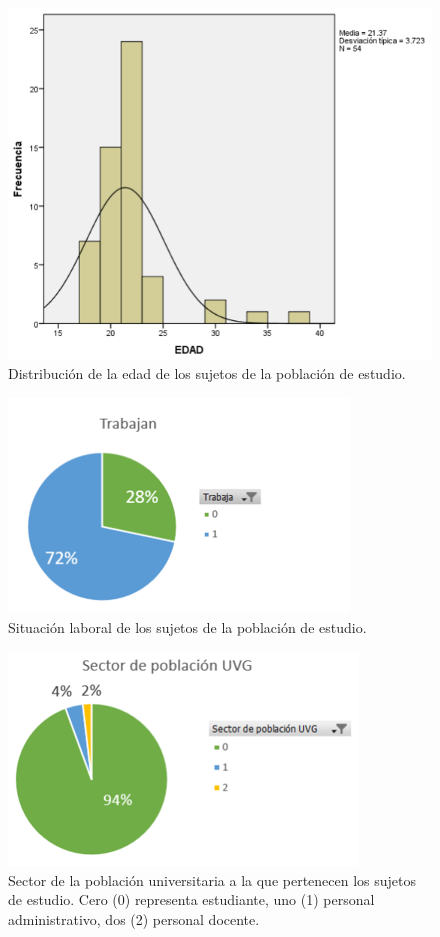 \begin{figure}
    \centering
    \includegraphics[scale=0.85]{figuras/Imagen14.png}
    \caption{Distribución de la edad de los sujetos de la población de estudio.}
    \label{fig:my_label}
\end{figure}
\begin{figure}
    \centering
    \includegraphics[scale=1]{figuras/Imagen15.png}
    \caption{Situación laboral de los sujetos de la población de estudio.}
    \label{fig:my_label}
\end{figure}
\begin{figure}
    \centering
    \includegraphics[scale=1]{figuras/Imagen16.png}
    \caption{Sector de la población universitaria a la que pertenecen los sujetos de estudio. Cero (0) representa estudiante, uno (1) personal administrativo, dos (2) personal docente.}
    \label{fig:my_label}
\end{figure}
